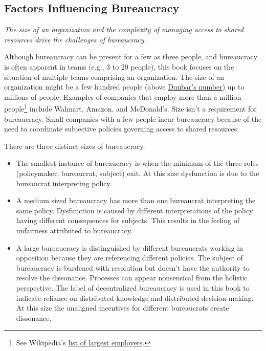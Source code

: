 \subsection*{Factors Influencing Bureaucracy}

\textit{The size of an organization and the complexity of managing access to shared resources drive the challenges of bureaucracy.}

Although bureaucracy can be present for a few as three people, and bureaucracy is often apparent in teams (e.g., 3 to 20 people), this book focuses on the situation of multiple teams comprising an organization. The size of an organization might be a few hundred people (above \href{https://en.wikipedia.org/wiki/Dunbar\%27s_number}{Dunbar's number})\iftoggle{WPinmargin}{\marginpar{$>$Wikipedia: Dunbar's number}}{}
 up to millions of people. 
Examples of companies that employ more than a million people\footnote{See Wikipedia's \href{https://en.wikipedia.org/wiki/List_of_largest_employers}{list of largest employers}.
} include Walmart, Amazon, and McDonald's. Size isn't a requirement for bureaucracy. Small companies with a few people incur bureaucracy because of the need to coordinate subjective policies governing access to shared resources. 


There are three distinct sizes of bureaucracy.
\begin{itemize}
\item The smallest instance of bureaucracy is when the minimum of the three roles (policymaker, bureaucrat, subject) exit. At this size dysfunction is due to the bureaucrat interpreting policy.
\item A medium sized bureaucracy has more than one bureaucrat interpreting the same policy. Dysfunction is caused by different interpretations of the policy having different consequences for subjects. This results in the feeling of unfairness attributed to bureaucracy.
\item A large bureaucracy is distinguished by different bureaucrats working in opposition because they are referencing different policies. The subject of bureaucracy is burdened with resolution but doesn't have the authority to resolve the dissonance. Processes can appear nonsensical from the holistic perspective.
The label of \gls{decentralized bureaucracy} is used in this book to indicate reliance on distributed knowledge and distributed decision making. At this size the unaligned incentives for different bureaucrats create dissonance.
\end{itemize}

